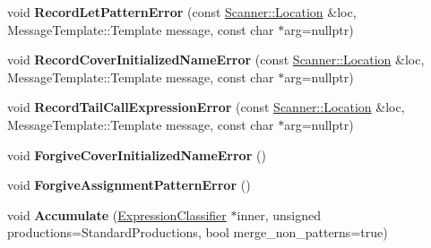\begin{DoxyCompactItemize}
\item 
void {\bfseries Record\+Let\+Pattern\+Error} (const \hyperlink{structv8_1_1internal_1_1_scanner_1_1_location}{Scanner\+::\+Location} \&loc, Message\+Template\+::\+Template message, const char $\ast$arg=nullptr)\hypertarget{classv8_1_1internal_1_1_expression_classifier_a1db80f41181ab4379e840b5b9c1f8b7b}{}\label{classv8_1_1internal_1_1_expression_classifier_a1db80f41181ab4379e840b5b9c1f8b7b}

\item 
void {\bfseries Record\+Cover\+Initialized\+Name\+Error} (const \hyperlink{structv8_1_1internal_1_1_scanner_1_1_location}{Scanner\+::\+Location} \&loc, Message\+Template\+::\+Template message, const char $\ast$arg=nullptr)\hypertarget{classv8_1_1internal_1_1_expression_classifier_ada5b13125eacf9342ad0d17cecf390ae}{}\label{classv8_1_1internal_1_1_expression_classifier_ada5b13125eacf9342ad0d17cecf390ae}

\item 
void {\bfseries Record\+Tail\+Call\+Expression\+Error} (const \hyperlink{structv8_1_1internal_1_1_scanner_1_1_location}{Scanner\+::\+Location} \&loc, Message\+Template\+::\+Template message, const char $\ast$arg=nullptr)\hypertarget{classv8_1_1internal_1_1_expression_classifier_a3e88424685f2250b9dc09f6a5e703d29}{}\label{classv8_1_1internal_1_1_expression_classifier_a3e88424685f2250b9dc09f6a5e703d29}

\item 
void {\bfseries Forgive\+Cover\+Initialized\+Name\+Error} ()\hypertarget{classv8_1_1internal_1_1_expression_classifier_ac23fc96178fd2afd84eaa81152e97b8f}{}\label{classv8_1_1internal_1_1_expression_classifier_ac23fc96178fd2afd84eaa81152e97b8f}

\item 
void {\bfseries Forgive\+Assignment\+Pattern\+Error} ()\hypertarget{classv8_1_1internal_1_1_expression_classifier_a0fd168b34aa403a9c6b18b772dc543a6}{}\label{classv8_1_1internal_1_1_expression_classifier_a0fd168b34aa403a9c6b18b772dc543a6}

\item 
void {\bfseries Accumulate} (\hyperlink{classv8_1_1internal_1_1_expression_classifier}{Expression\+Classifier} $\ast$inner, unsigned productions=Standard\+Productions, bool merge\+\_\+non\+\_\+patterns=true)\hypertarget{classv8_1_1internal_1_1_expression_classifier_a59493f944ead1e3818b0555527dc6db0}{}\label{classv8_1_1internal_1_1_expression_classifier_a59493f944ead1e3818b0555527dc6db0}


\end{DoxyCompactItemize}
